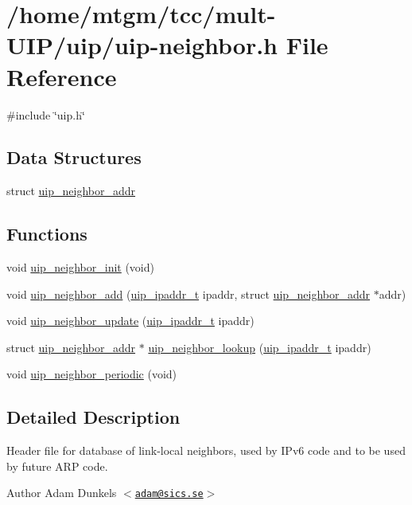 \hypertarget{uip-neighbor_8h}{
\section{/home/mtgm/tcc/mult-\/UIP/uip/uip-\/neighbor.h File Reference}
\label{uip-neighbor_8h}
}
{\ttfamily \#include \char`\"{}uip.h\char`\"{}}\par
\subsection*{Data Structures}
\begin{DoxyCompactItemize}
\item 
struct \hyperlink{structuip__neighbor__addr}{uip\_\-neighbor\_\-addr}
\end{DoxyCompactItemize}
\subsection*{Functions}
\begin{DoxyCompactItemize}
\item 
void \hyperlink{uip-neighbor_8h_a1273664aba3e6a2a46e87dcb1a5f19ad}{uip\_\-neighbor\_\-init} (void)
\item 
void \hyperlink{uip-neighbor_8h_a88460bea09a462d0e22511cb567eee14}{uip\_\-neighbor\_\-add} (\hyperlink{group__uip_ga1ef35301f43a5bbb9f89f07b5a36b9a0}{uip\_\-ipaddr\_\-t} ipaddr, struct \hyperlink{structuip__neighbor__addr}{uip\_\-neighbor\_\-addr} $\ast$addr)
\item 
void \hyperlink{uip-neighbor_8h_a1d5ce7047650f3ecee0814dbc8714099}{uip\_\-neighbor\_\-update} (\hyperlink{group__uip_ga1ef35301f43a5bbb9f89f07b5a36b9a0}{uip\_\-ipaddr\_\-t} ipaddr)
\item 
struct \hyperlink{structuip__neighbor__addr}{uip\_\-neighbor\_\-addr} $\ast$ \hyperlink{uip-neighbor_8h_a692d80636342d564422ccd9296ad568d}{uip\_\-neighbor\_\-lookup} (\hyperlink{group__uip_ga1ef35301f43a5bbb9f89f07b5a36b9a0}{uip\_\-ipaddr\_\-t} ipaddr)
\item 
void \hyperlink{uip-neighbor_8h_a890e822616a6839dfbf51dcb591b8e99}{uip\_\-neighbor\_\-periodic} (void)
\end{DoxyCompactItemize}


\subsection{Detailed Description}
Header file for database of link-\/local neighbors, used by IPv6 code and to be used by future ARP code. \begin{DoxyAuthor}{Author}
Adam Dunkels $<$\href{mailto:adam@sics.se}{\tt adam@sics.se}$>$ 
\end{DoxyAuthor}


